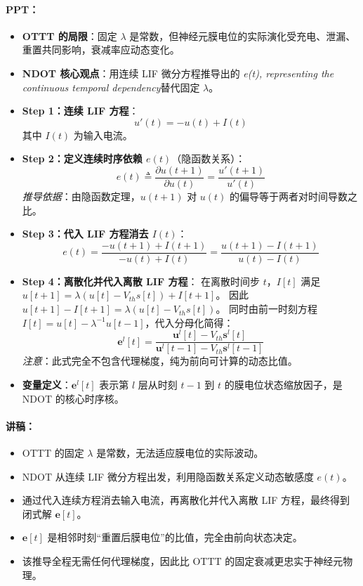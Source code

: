 \documentclass[journal,12pt,onecolumn]{IEEEtran}
\begin{document}
\paragraph{\textbf{PPT：}}
\begin{itemize}
    \item \textbf{OTTT 的局限}：固定 \(\lambda\) 是常数，但神经元膜电位的实际演化受充电、泄漏、重置共同影响，衰减率应动态变化。
    
    \item \textbf{NDOT 核心观点}：用连续 LIF 微分方程推导出的 \textit{e(t), representing the continuous temporal dependency}替代固定 \(\lambda\)。
    
    \item \textbf{Step 1：连续 LIF 方程}\cite{jiang_ndot_nodate}：
    \[
    u'(t) = -u(t) + I(t)
    \]
    其中 \(I(t)\) 为输入电流。
    
    \item \textbf{Step 2：定义连续时序依赖 \(e(t)\)}（隐函数关系）：
    \[
    e(t) \triangleq \frac{\partial u(t+1)}{\partial u(t)}
    = \frac{u'(t+1)}{u'(t)}
    \]
    \textit{推导依据}：由隐函数定理，\(u(t+1)\) 对 \(u(t)\) 的偏导等于两者对时间导数之比。
    
    \item \textbf{Step 3：代入 LIF 方程消去 \(I(t)\)}：
    \[
    e(t) = \frac{-u(t+1) + I(t+1)}{-u(t) + I(t)}
    = \frac{u(t+1) - I(t+1)}{u(t) - I(t)}
    \]
    
    \item \textbf{Step 4：离散化并代入离散 LIF 方程}：
    在离散时间步 \(t\)，\(I[t]\) 满足 \(u[t+1] = \lambda(u[t] - V_{th}s[t]) + I[t+1]\)。
    因此 \(u[t+1] - I[t+1] = \lambda(u[t] - V_{th}s[t])\)。
    同时由前一时刻方程 \(I[t] = u[t] - \lambda^{-1}u[t-1]\)，代入分母化简得：
    \[
    \boxed{
    \mathbf{e}^{l}[t] =
    \frac{\mathbf{u}^{l}[t] - V_{th}\mathbf{s}^{l}[t]}
         {\mathbf{u}^{l}[t-1] - V_{th}\mathbf{s}^{l}[t-1]}
    }
    \]
    \textit{注意}：此式完全不包含代理梯度，纯为前向可计算的动态比值。
    
    \item \textbf{变量定义}：\(\mathbf{e}^{l}[t]\) 表示第 \(l\) 层从时刻 \(t-1\) 到 \(t\) 的膜电位状态缩放因子，是 NDOT 的核心时序核。
\end{itemize}

\paragraph{\textbf{讲稿：}}
\begin{itemize}
    \item OTTT 的固定 \(\lambda\) 是常数，无法适应膜电位的实际波动。
    \item NDOT 从连续 LIF 微分方程出发，利用隐函数关系定义动态敏感度 \(e(t)\)。
    \item 通过代入连续方程消去输入电流，再离散化并代入离散 LIF 方程，最终得到闭式解 \(\mathbf{e}[t]\)。
    \item \(\mathbf{e}[t]\) 是相邻时刻“重置后膜电位”的比值，完全由前向状态决定。
    \item 该推导全程无需任何代理梯度，因此比 OTTT 的固定衰减更忠实于神经元物理。
\end{itemize}
\end{document}

